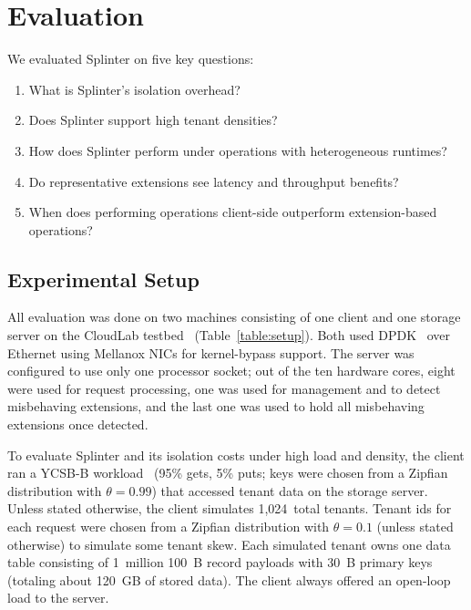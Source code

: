 \section{Evaluation}
\label{sec:evaluation}

We evaluated Splinter on five key questions:


\begin{enumerate}
\item What is Splinter's isolation overhead?
\item Does Splinter support high tenant densities?
\item How does Splinter perform under operations with heterogeneous runtimes?
\item Do representative extensions see latency and throughput benefits?
\item When does performing operations client-side outperform extension-based operations?
\end{enumerate}

\subsection{Experimental Setup}
All evaluation was done on two machines consisting of one client
and one storage server on the CloudLab
testbed~\cite{cloudlab} (Table~\ref{table:setup}). Both used
DPDK~\cite{dpdk} over Ethernet using Mellanox NICs for kernel-bypass
support. The server was configured to use only one processor socket; out
of the ten hardware cores, eight were used for request processing, one
was used for management and to detect misbehaving extensions, and the
last one was used to hold all misbehaving extensions once detected.

To evaluate Splinter and its isolation costs under high load and density, the
  client ran a YCSB-B workload~\cite{ycsb} (95\% gets, 5\% puts;
  keys were chosen from a Zipfian distribution with $\theta=0.99$) that
  accessed tenant data on the storage server.
Unless stated otherwise, the client simulates 1,024~total tenants.
Tenant ids for each request were chosen from a Zipfian distribution
  with $\theta=0.1$ (unless stated otherwise) to simulate some tenant skew.
Each simulated tenant owns one data table consisting of 1~million 100~B record
  payloads with 30~B primary keys (totaling about 120~GB of stored data).
The client always offered an open-loop load to the server.


